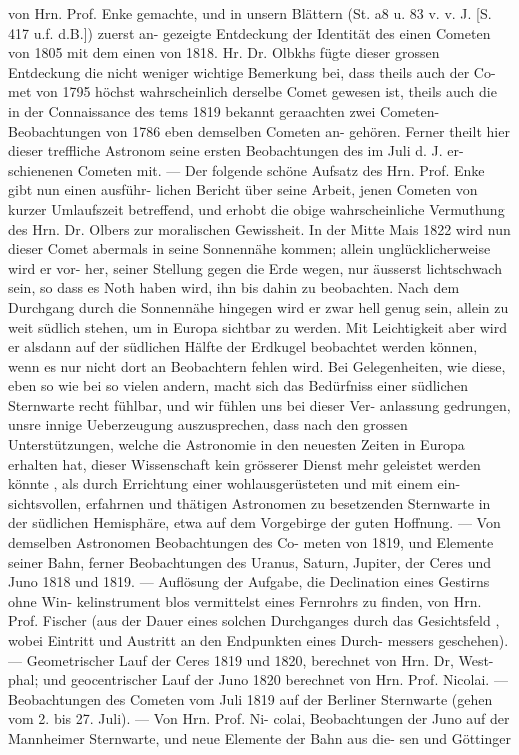 \documentclass[12pt,a4paper]{article}
\begin{document}
{{{{{{{{von  Hrn.  Prof.  Enke  gemachte,  und  in  unsern  Blättern  (St.  a8  u.  83  v.  v.  J.  [S.  417  u.f.  d.B.])  zuerst  an- gezeigte Entdeckung  der  Identität  des  einen  Cometen  von  1805  mit  dem  einen  von  1818.  Hr.  Dr.  Olbkhs fügte  dieser  grossen  Entdeckung  die  nicht  weniger  wichtige  Bemerkung  bei,  dass  theils  auch  der  Co- met  von  1795  höchst  wahrscheinlich  derselbe  Comet  gewesen  ist,  theils  auch  die  in  der  Connaissance des  tems  1819  bekannt  geraachten  zwei  Cometen-Beobachtungen  von  1786  eben  demselben  Cometen  an- gehören. Ferner  theilt  hier  dieser  treffliche  Astronom  seine  ersten  Beobachtungen  des  im  Juli  d.  J.  er- schienenen Cometen  mit.  ---  Der  folgende  schöne  Aufsatz  des  Hrn.  Prof.  Enke  gibt  nun  einen  ausführ- lichen Bericht  über  seine  Arbeit,  jenen  Cometen  von  kurzer  Umlaufszeit  betreffend,  und  erhobt  die  obige wahrscheinliche  Vermuthung  des  Hrn.  Dr.  Olbers  zur  moralischen  Gewissheit.  In  der  Mitte  Mais  1822 wird  nun  dieser  Comet  abermals  in  seine  Sonnennähe  kommen;  allein  unglücklicherweise  wird  er  vor- her, seiner  Stellung  gegen  die  Erde  wegen,  nur  äusserst  lichtschwach  sein,  so  dass  es  Noth  haben  wird, ihn  bis  dahin  zu  beobachten.  Nach  dem  Durchgang  durch  die  Sonnennähe  hingegen  wird  er  zwar  hell genug  sein,  allein  zu  weit  südlich  stehen,  um  in  Europa  sichtbar  zu  werden.  Mit  Leichtigkeit  aber wird  er  alsdann  auf  der  südlichen  Hälfte  der  Erdkugel  beobachtet  werden  können,  wenn  es  nur  nicht dort  an  Beobachtern  fehlen  wird.  Bei  Gelegenheiten,  wie  diese,  eben  so  wie  bei  so  vielen  andern, macht  sich  das  Bedürfniss  einer  südlichen  Sternwarte  recht  fühlbar,  und  wir  fühlen  uns  bei  dieser  Ver- anlassung gedrungen,  unsre  innige  Ueberzeugung  auszusprechen,  dass  nach  den  grossen  Unterstützungen, welche  die  Astronomie  in  den  neuesten  Zeiten  in  Europa  erhalten  hat,  dieser  Wissenschaft  kein  grösserer Dienst  mehr  geleistet  werden  könnte ,  als  durch  Errichtung  einer  wohlausgerüsteten  und  mit  einem  ein- sichtsvollen,  erfahrnen  und  thätigen  Astronomen  zu  besetzenden  Sternwarte  in  der  südlichen  Hemisphäre, etwa  auf  dem  Vorgebirge  der  guten  Hoffnung.  ---  Von  demselben  Astronomen  Beobachtungen  des  Co- meten von  1819,  und  Elemente  seiner  Bahn,  ferner  Beobachtungen  des  Uranus,  Saturn,  Jupiter,  der Ceres  und  Juno  1818  und  1819.  ---  Auflösung  der  Aufgabe,  die  Declination  eines  Gestirns  ohne  Win- kelinstrument blos  vermittelst  eines  Fernrohrs  zu  finden,  von  Hrn.  Prof.  Fischer  (aus  der  Dauer  eines solchen  Durchganges  durch  das  Gesichtsfeld ,  wobei  Eintritt  und  Austritt  an  den  Endpunkten  eines  Durch- messers geschehen).  ---  Geometrischer  Lauf  der  Ceres  1819  und  1820,  berechnet  von  Hrn.  Dr,  West- phal;  und  geocentrischer  Lauf  der  Juno  1820  berechnet  von  Hrn.  Prof.  Nicolai.  ---  Beobachtungen  des Cometen  vom  Juli  1819  auf  der  Berliner  Sternwarte  (gehen  vom  2.  bis  27.  Juli).  ---  Von  Hrn.  Prof.  Ni- colai, Beobachtungen  der  Juno  auf  der  Mannheimer  Sternwarte,  und  neue  Elemente  der  Bahn  aus  die- sen und  Göttinger  }}}}}}}}
\end{document}
